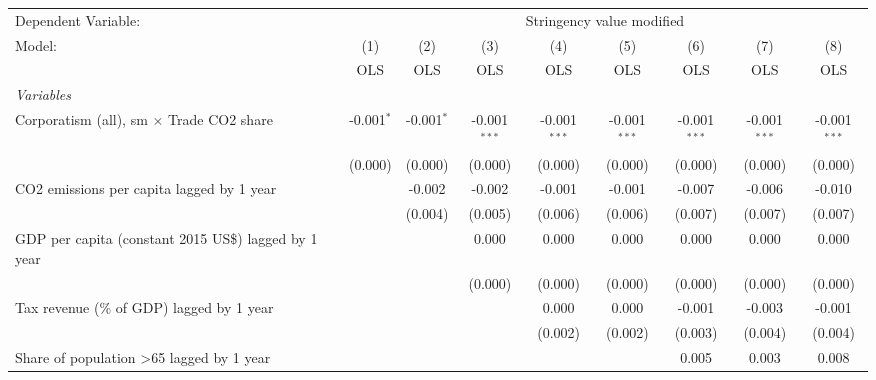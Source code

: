 
\begingroup
\centering
\begin{tabular}{lcccccccc}
   \toprule
   Dependent Variable: & \multicolumn{8}{c}{Stringency value modified}\\
   Model:                                                    & (1)          & (2)          & (3)            & (4)            & (5)            & (6)            & (7)            & (8)\\  
                                                             &  OLS         & OLS          & OLS            & OLS            & OLS            & OLS            & OLS            & OLS\\  
   \midrule
   \emph{Variables}\\
   Corporatism (all), sm $\times$ Trade CO2 share            & -0.001$^{*}$ & -0.001$^{*}$ & -0.001$^{***}$ & -0.001$^{***}$ & -0.001$^{***}$ & -0.001$^{***}$ & -0.001$^{***}$ & -0.001$^{***}$\\   
                                                             & (0.000)      & (0.000)      & (0.000)        & (0.000)        & (0.000)        & (0.000)        & (0.000)        & (0.000)\\   
   CO2 emissions per capita lagged by 1 year                 &              & -0.002       & -0.002         & -0.001         & -0.001         & -0.007         & -0.006         & -0.010\\   
                                                             &              & (0.004)      & (0.005)        & (0.006)        & (0.006)        & (0.007)        & (0.007)        & (0.007)\\   
   GDP per capita (constant 2015 US\$) lagged by 1 year      &              &              & 0.000          & 0.000          & 0.000          & 0.000          & 0.000          & 0.000\\   
                                                             &              &              & (0.000)        & (0.000)        & (0.000)        & (0.000)        & (0.000)        & (0.000)\\   
   Tax revenue (\% of GDP) lagged by 1 year                  &              &              &                & 0.000          & 0.000          & -0.001         & -0.003         & -0.001\\   
                                                             &              &              &                & (0.002)        & (0.002)        & (0.003)        & (0.004)        & (0.004)\\   
   Share of population >65 lagged by 1 year                  &              &              &                &                &                & 0.005          & 0.003          & 0.008\\   

\end{tabular}
